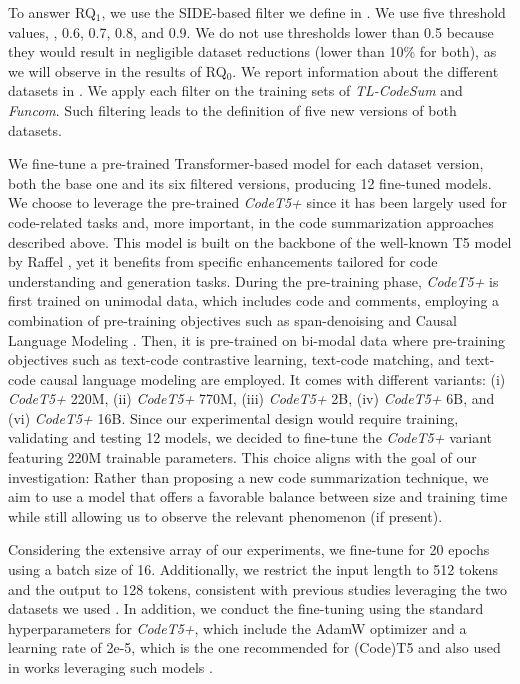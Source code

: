 To answer RQ$_{1}$, we use the SIDE-based filter we define in . We use five threshold values, , 0.6, 0.7, 0.8, and 0.9. We do not use thresholds lower than 0.5 because they would result in negligible dataset reductions (lower than 10\% for both), as we will observe in the results of RQ$_{0}$.
We report information about the different datasets in . 
We apply each filter on the training sets of \textit{TL-CodeSum} and \textit{Funcom}. Such filtering leads to the definition of five new versions of both datasets.

We fine-tune a pre-trained Transformer-based model for each dataset version, \ie both the base one and its six filtered versions, producing 12 fine-tuned models.
We choose to leverage the pre-trained \emph{CodeT5+} \cite{wang2023codet5+} since it has been largely used for code-related tasks \cite{ahmed2024automatic,phan2024repohyper,yang2024important} and, more important, in the code summarization approaches described above. This model is built on the backbone of the well-known T5 model by Raffel \etal \cite{raffel2020exploring}, yet it benefits from specific enhancements tailored for code understanding and generation tasks. During the pre-training phase, \emph{CodeT5+} is first trained on unimodal data, which includes code and comments, employing a combination of pre-training objectives such as span-denoising \cite{raffel2020exploring} and Causal Language Modeling \cite{soltan2022alexatm,tay2022ul2}. Then, it is pre-trained on bi-modal data where pre-training objectives such as text-code contrastive learning, text-code matching, and text-code causal language modeling are employed. It comes with different variants: (i) \emph{CodeT5+} 220M, (ii) \emph{CodeT5+} 770M, (iii) \emph{CodeT5+} 2B, (iv) \emph{CodeT5+} 6B, and (vi) \emph{CodeT5+} 16B.
Since our experimental design would require training, validating and testing 12 models, we decided to fine-tune the \emph{CodeT5+} variant featuring 220M trainable parameters.
This choice aligns with the goal of our investigation: Rather than proposing a new code summarization technique, we aim to use a model that offers a favorable balance between size and training time while still allowing us to observe the relevant phenomenon (if present).

Considering the extensive array of our experiments, we fine-tune for 20 epochs using a batch size of 16. Additionally, we restrict the input length to 512 tokens and the output to 128 tokens, consistent with previous studies leveraging the two datasets we used \cite{mastropaolo2022using,zhou2022automatic,tufano2023automating}. In addition, we conduct the fine-tuning using the standard hyperparameters for \emph{CodeT5+}, which include the AdamW optimizer \cite{loshchilov2017decoupled} and a learning rate of 2e-5, which is the one recommended for (Code)T5 and also used in works leveraging such models \cite{mastropaolo2023towards,ciniselli2024generalizability,mastropaolo2024vul}.

